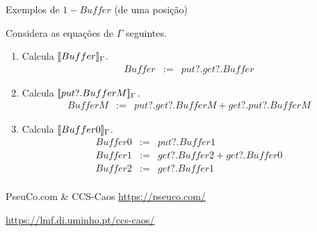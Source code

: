 \documentclass[aspectratio=169]{beamer}
\begin{document}
\begin{frame}
\begin{exem}{Exemplos de $1-Buffer$ (de uma posição)}

Considera as  equações de $\Gamma$ seguintes.
\begin{enumerate}
\item Calcula $[\![ Buffer ]\!]_\Gamma$.
\begin{eqnarray*}
	Buffer &:=& put?. get?.Buffer
\end{eqnarray*}

\item Calcula $[\![ put?.BufferM ]\!]_\Gamma$.
\begin{eqnarray*}
	BufferM &:=& put?. get?.BufferM + get?.put?.BufferM
\end{eqnarray*}
\item Calcula $[\![ Buffer0 ]\!]_\Gamma$.
\begin{eqnarray*}
	Buffer0 &:=& put?.Buffer1 \\
	Buffer1 &:=& get?.Buffer2 + get?.Buffer0\\
	Buffer2 &:=& get?.Buffer1\\
\end{eqnarray*}

\end{enumerate}
\end{exem}
\end{frame}

\begin{frame}{PseuCo.com \& CCS-Caos}
\url{https://pseuco.com/}{}

\bigskip

\url{https://lmf.di.uminho.pt/ccs-caos/}{}

\end{frame}
\end{document}
